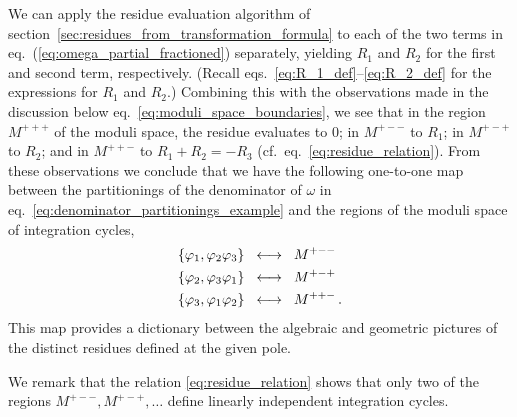 \documentclass[dvipsnames,preprint,12pt,sort&compress]{elsarticle}
\begin{document}
We can apply the residue evaluation algorithm of section~\ref{sec:residues_from_transformation_formula}
to each of the two terms in eq.~(\ref{eq:omega_partial_fractioned}) separately,
yielding $R_1$ and $R_2$ for the first and second term, respectively.
(Recall eqs.~\eqref{eq:R_1_def}--\eqref{eq:R_2_def} for the expressions for $R_1$ and $R_2$.)
Combining this with the observations
made in the discussion below eq.~\eqref{eq:moduli_space_boundaries}, we see
that in the region $M^{+++}$ of the moduli space, the residue evaluates to
$0$; in $M^{+--}$ to $R_1$; in $M^{+-+}$ to $R_2$; and in $M^{++-}$ to
$R_1 + R_2 = -R_3$ (cf.~eq.~\eqref{eq:residue_relation}).
From these observations we conclude that we have the following one-to-one map between the partitionings
of the denominator of $\omega$ in eq.~\eqref{eq:denominator_partitionings_example}
and the regions of the moduli space of integration cycles,
\begin{equation}
\begin{aligned}
\{ \varphi_1, \varphi_2 \varphi_3 \}  \hspace{2mm}&\longleftrightarrow\hspace{2mm}  M^{+--} \\
\{ \varphi_2, \varphi_3 \varphi_1 \}  \hspace{2mm}&\longleftrightarrow\hspace{2mm}  M^{+-+} \\
\{ \varphi_3, \varphi_1 \varphi_2 \}  \hspace{2mm}&\longleftrightarrow\hspace{2mm}  M^{++-} \,.
\end{aligned}
\end{equation}
This map provides a dictionary between the algebraic and geometric
pictures of the distinct residues defined at the given pole.

We remark that the relation \eqref{eq:residue_relation} shows that
only two of the regions $M^{+--}, M^{+-+},\ldots$ define
linearly independent integration cycles.



%




\end{document}

